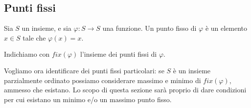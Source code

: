 \documentclass[12pt]{article}
\numberwithin{theorem}{subsection}
\begin{document}
\subsection{Punti fissi}
\begin{definition}
	Sia $S$ un insieme, e sia $\varphi : S \rightarrow S$ una funzione. Un punto fisso di $\varphi$ è un elemento $x \in S$ tale che $\varphi(x) = x$.
	
	Indichiamo con $fix(\varphi)$ l'insieme dei punti fissi di $\varphi$.
\end{definition}

Vogliamo ora identificare dei punti fissi particolari: se $S$ è un insieme parzialmente ordinato possiamo considerare massimo e minimo di $fix(\varphi)$, ammesso che esistano. Lo scopo di questa sezione sarà proprio di dare condizioni per cui esistano un minimo e/o un massimo punto fisso.
\end{document}
